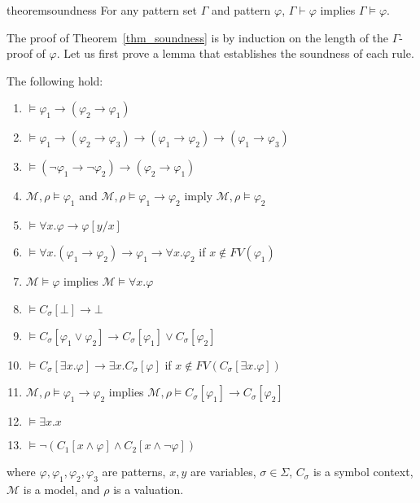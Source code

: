 \documentclass[acmsmall]{acmart}
\theoremstyle{acmdefinition}
\newcommand{\imp}{\to}
\newcommand{\MM}{\mathcal{M}}
\newcommand{\CSub}[1]{C_{#1}}
\newcommand{\Csigmaapp}[1]{\CSub{\sigma}[#1]}
\newcommand{\fv}{\mathit{FV}}
\newcommand{\FV}{\fv}
\begin{document}
\begin{restatable}[Soundness]{theorem}{soundness}
\label{thm_soundness}
For any pattern set $\Gamma$ and pattern $\varphi$,
$\Gamma \vdash \varphi$ implies $\Gamma \vDash \varphi$.
\end{restatable}
The proof of Theorem~\ref{thm_soundness} is by induction on the
length of the $\Gamma$-proof of $\varphi$.
Let us first prove a lemma that establishes
the soundness of each rule.

\begin{lemma}
\label{lemma_soundness_lemma}
The following hold:
\begin{enumerate}
	\item $ \vDash \varphi_1 \imp (\varphi_2 \imp \varphi_1)$
	\item $ \vDash \varphi_1 \imp (\varphi_2 \imp \varphi_3)
	\imp (\varphi_1 \imp \varphi_2)
	\imp (\varphi_1 \imp \varphi_3)$
	\item $ \vDash (\neg \varphi_1 \imp \neg \varphi_2)
	\imp (\varphi_2 \imp \varphi_1)$
	\item $ \MM,\rho \vDash \varphi_1$ and
	$ \MM,\rho \vDash \varphi_1 \imp \varphi_2$
	imply
	$ \MM,\rho \vDash \varphi_2$
	\item $ \vDash \forall x . \varphi \imp \varphi[y/x]$
	\item $ \vDash \forall x . (\varphi_1 \imp \varphi_2)
	\imp \varphi_1 \imp \forall x . \varphi_2$
	if $x \not\in \FV(\varphi_1)$
	\item $ \MM \vDash \varphi$
	implies
	$ \MM \vDash \forall x . \varphi$
	\item $ \vDash \CSub{\sigma}[\bot] \imp \bot$
	\item $ \vDash \CSub{\sigma}[\varphi_1 \vee \varphi_2]
	\imp \CSub{\sigma}[\varphi_1] 
	\vee \CSub{\sigma}[\varphi_2]$
	\item $ \vDash \CSub{\sigma}[\exists x . \varphi]
	\imp \exists x . \CSub{\sigma}[\varphi]$
	if $x \not\in \FV(\Csigmaapp{\exists x . \varphi})$
	\item $ \MM,\rho \vDash \varphi_1 \imp \varphi_2$
	implies
	$ \MM,\rho \vDash \CSub{\sigma}[\varphi_1] 
	\imp \CSub{\sigma}[\varphi_2]$
	\item $ \vDash \exists x . x$
	\item $ \vDash \neg (C_1[x \wedge \varphi] 
	\wedge C_2[x \wedge \neg \varphi])$
\end{enumerate}
where $\varphi,\varphi_1,\varphi_2,\varphi_3$ are patterns, 
$x,y$ are variables,
$\sigma \in \Sigma$,
$C_\sigma$ is a symbol context,
$\MM$ is a model,
and $\rho$ is a valuation.
\end{lemma}
\end{document}
